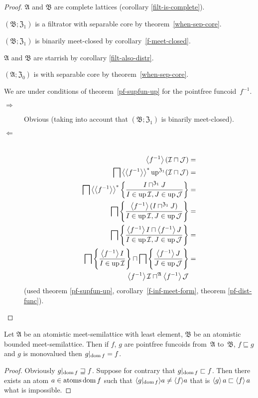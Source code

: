 \begin{proof}
$\mathfrak{A}$ and $\mathfrak{B}$ are complete lattices (corollary
\ref{filt-is-complete}).

$(\mathfrak{B};\mathfrak{Z}_{1})$ is a filtrator with separable core
by theorem~\ref{when-sep-core}.

$(\mathfrak{B};\mathfrak{Z}_{1})$ is binarily meet-closed by
corollary~\ref{f-meet-closed}.

$\mathfrak{A}$ and $\mathfrak{B}$ are starrish by corollary \ref{filt-also-distr}.

$(\mathfrak{A};\mathfrak{Z}_{0})$ is with separable core by theorem~\ref{when-sep-core}.

We are under conditions of theorem~\ref{pf-supfun-up} for the pointfree funcoid~$f^{-1}$.
\begin{description}
\item [{$\Rightarrow$}] Obvious (taking into account that $(\mathfrak{B};\mathfrak{Z}_{1})$
is binarily meet-closed).
\item [{$\Leftarrow$}] ~
\begin{align*}
\left\langle f^{-1}\right\rangle(\mathcal{I}\sqcap\mathcal{J}) & =\\
\bigsqcap\left\langle \left\langle f^{-1}\right\rangle\right\rangle ^{\ast}\operatorname{up}^{\mathfrak{Z}_{1}}(\mathcal{I}\sqcap\mathcal{J}) & =\\
\bigsqcap\left\langle \left\langle f^{-1}\right\rangle\right\rangle ^{\ast}\left\{ \frac{I\sqcap^{\mathfrak{Z}_{1}}J}{I\in\operatorname{up}\mathcal{I},J\in\operatorname{up}\mathcal{J}}\right\} & =\\
\bigsqcap\left\{ \frac{\left\langle f^{-1}\right\rangle(I\sqcap^{\mathfrak{Z}_{1}}J)}{I\in\operatorname{up}\mathcal{I},J\in\operatorname{up}\mathcal{J}}\right\} & =\\
\bigsqcap\left\{ \frac{\left\langle f^{-1}\right\rangle I\sqcap\left\langle f^{-1}\right\rangle J}{I\in\operatorname{up}\mathcal{I},J\in\operatorname{up}\mathcal{J}}\right\} & =\\
\bigsqcap\left\{ \frac{\left\langle f^{-1}\right\rangle I}{I\in\operatorname{up}\mathcal{I}}\right\}\sqcap\bigsqcap\left\{ \frac{\left\langle f^{-1}\right\rangle J}{J\in\operatorname{up}\mathcal{J}}\right\} & =\\
\left\langle f^{-1}\right\rangle\mathcal{I}\sqcap^{\mathfrak{A}}\left\langle f^{-1}\right\rangle\mathcal{J}
\end{align*}
(used theorem \ref{pf-supfun-up}, corollary~\ref{f-inf-meet-form},
theorem \ref{pf-dist-func}).
\end{description}
\end{proof}
\begin{prop}
Let $\mathfrak{A}$ be an atomistic meet-semilattice with least element,
$\mathfrak{B}$ be an atomistic bounded meet-semilattice. Then if
$f$, $g$ are pointfree funcoids from~$\mathfrak{A}$ to~$\mathfrak{B}$,
$f\sqsubseteq g$ and $g$ is monovalued then $g|_{\operatorname{dom} f}=f$.\end{prop}
\begin{proof}
Obviously $g|_{\operatorname{dom} f}\sqsupseteq f$. Suppose for contrary that $g|_{\operatorname{dom} f}\sqsubset f$.
Then there exists an atom $a\in\operatorname{atoms}\operatorname{dom} f$ such that $\langle g|_{\operatorname{dom} f}\rangle a\neq\langle f\rangle a$
that is $\left\langle g\right\rangle a\sqsubset\left\langle f\right\rangle a$ what is impossible.
\end{proof}

